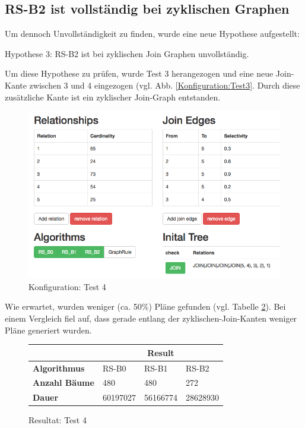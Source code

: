 \subsection{RS-B2 ist vollständig bei zyklischen Graphen}
Um dennoch Unvollständigkeit zu finden, wurde eine neue Hypothese aufgestellt:

Hypothese 3: RS-B2 ist bei zyklischen Join Graphen unvollständig.

Um diese Hypothese zu prüfen, wurde Test 3 herangezogen und eine neue Join-Kante zwischen 3 und 4 eingezogen (vgl. Abb. \ref{Konfiguration:Test3}. Durch diese zusätzliche Kante ist ein zyklischer Join-Graph entstanden. 


\begin{figure}[ht]
  \centering
  \includegraphics[width=\textwidth]{05_ResultsEvaluation/00_media/Test4.png}
  \caption{Konfiguration: Test 4}
  \label{Konfiguration:Test4}
\end{figure}

Wie erwartet, wurden weniger (ca. 50\%) Pläne gefunden (vgl. Tabelle \ref{Result:Test4}). Bei einem Vergleich fiel auf, dass gerade entlang der zyklischen-Join-Kanten weniger Pläne generiert wurden.


\begin{figure}[h]
\centering
\begin{tabular}{|l|l|l|l|}
\hline
                         & \multicolumn{3}{c|}{{\bf Result}} \\ \hline
{\bf Algorithmus}        & RS-B0     & RS-B1     & RS-B2     \\ \hline
{\bf Anzahl Bäume}       & 480       & 480       & 272       \\ \hline
{\bf Dauer}              & 60197027  & 56166774  & 28628930  \\ \hline
\end{tabular}

\caption{Resultat: Test 4}
\label{Result:Test4}
\end{figure}

